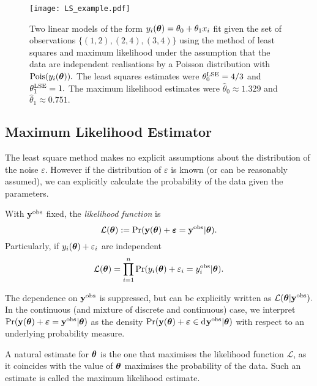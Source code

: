 \begin{figure}[htbp]
    \centering
    \texttt{[image: LS\_example.pdf]}
    \caption{
        Two linear models of the form
        $y_i(\bm{\theta}) = \theta_0 + \theta_1x_i$ fit given the set
        of observations $\{(1, 2), (2, 4), (3, 4)\}$ using the method of
        least squares and maximum likelihood under
        the assumption that the data are independent realisations by a Poisson
        distribution with $\operatorname{Pois}(y_i(\bm{\theta})).$ The least squares estimates
        were $\theta^{\mathrm{LSE}}_0 = 4/3$ and $\theta^{\mathrm{LSE}}_1 = 1.$ The maximum likelihood
        estimates were $\hat{\theta}_0 \approx 1.329$ and
        $\hat{\theta}_1 \approx 0.751.$
    }
    \label{fig:LSE}
\end{figure}

\subsection*{Maximum Likelihood Estimator}

The least square method makes no explicit assumptions about the distribution
of the noise $\varepsilon.$ However if the distribution of $\varepsilon$ is
known (or can be reasonably assumed), we can
explicitly calculate the probability of the data given the parameters.

\begin{definition}
    With $\mathbf{y}^{\mathrm{obs}}$ fixed, the \emph{likelihood function} is
    $$
        \mathcal{L}(\bm{\theta})
        := \Pr(
        \mathbf{y}(\bm{\theta}) + \bm{\varepsilon} = \mathbf{y}^{\mathrm{obs}}
        | \bm{\theta}
        ).
    $$
    Particularly, if $y_i(\bm{\theta}) + \varepsilon_i$ are independent
    $$
        \mathcal{L}(\bm{\theta})
        = \prod_{i = 1}^n
        \Pr(
        y_i(\bm{\theta}) + \varepsilon_i = y_i^{\mathrm{obs}}
        | \bm{\theta}
        ).
    $$
\end{definition}

The dependence on $\mathbf{y}^{\mathrm{obs}}$ is suppressed, but can be
explicitly written as $\mathcal{L}(\bm{\theta}|\mathbf{y}^{\mathrm{obs}}).$ In the continuous
(and mixture of discrete and continuous) case,
we interpret
$
    \Pr(
    \mathbf{y}(\bm{\theta}) + \bm{\varepsilon} = \mathbf{y}^{\mathrm{obs}}
    | \bm{\theta}
    )
$
as the density
$
    \Pr(
    \by(\btheta) + \bm{\varepsilon} \in \diff\by^\obs
    | \btheta
    )
$ with respect to an underlying probability measure.

A natural estimate for $\bm{\theta}$ is the one that maximises the likelihood
function $\mathcal{L}$, as it coincides with the value of $\bm{\theta}$ maximises the
probability of the data. Such an estimate is called the maximum likelihood
estimate.

